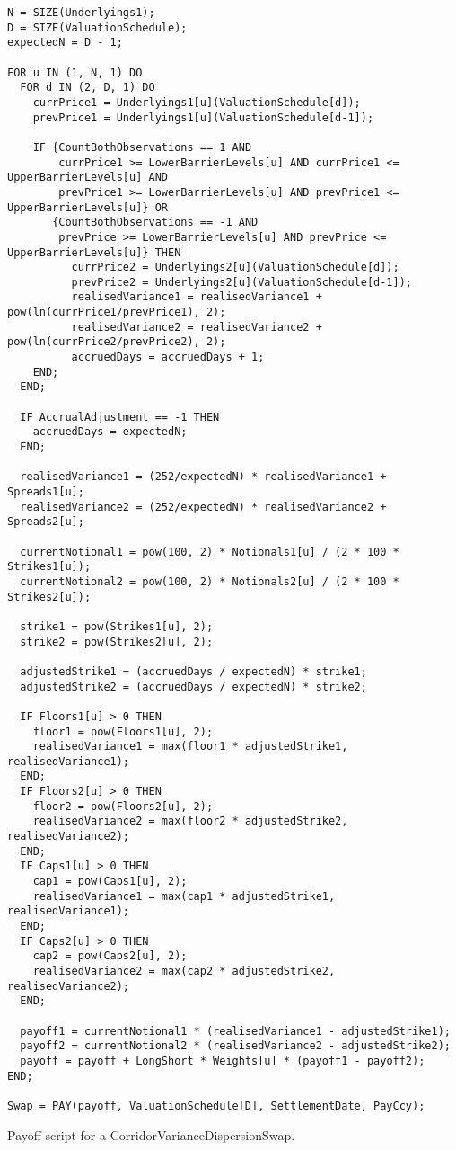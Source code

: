 \begin{listing}[hbt]
\begin{verbatim}
N = SIZE(Underlyings1);
D = SIZE(ValuationSchedule);
expectedN = D - 1;

FOR u IN (1, N, 1) DO
  FOR d IN (2, D, 1) DO
    currPrice1 = Underlyings1[u](ValuationSchedule[d]);
    prevPrice1 = Underlyings1[u](ValuationSchedule[d-1]);

    IF {CountBothObservations == 1 AND
        currPrice1 >= LowerBarrierLevels[u] AND currPrice1 <= UpperBarrierLevels[u] AND
        prevPrice1 >= LowerBarrierLevels[u] AND prevPrice1 <= UpperBarrierLevels[u]} OR
       {CountBothObservations == -1 AND
        prevPrice >= LowerBarrierLevels[u] AND prevPrice <= UpperBarrierLevels[u]} THEN
          currPrice2 = Underlyings2[u](ValuationSchedule[d]);
          prevPrice2 = Underlyings2[u](ValuationSchedule[d-1]);
          realisedVariance1 = realisedVariance1 + pow(ln(currPrice1/prevPrice1), 2);
          realisedVariance2 = realisedVariance2 + pow(ln(currPrice2/prevPrice2), 2);
          accruedDays = accruedDays + 1;
    END;
  END;

  IF AccrualAdjustment == -1 THEN
    accruedDays = expectedN;
  END;

  realisedVariance1 = (252/expectedN) * realisedVariance1 + Spreads1[u];
  realisedVariance2 = (252/expectedN) * realisedVariance2 + Spreads2[u];

  currentNotional1 = pow(100, 2) * Notionals1[u] / (2 * 100 * Strikes1[u]);
  currentNotional2 = pow(100, 2) * Notionals2[u] / (2 * 100 * Strikes2[u]);

  strike1 = pow(Strikes1[u], 2);
  strike2 = pow(Strikes2[u], 2);

  adjustedStrike1 = (accruedDays / expectedN) * strike1;
  adjustedStrike2 = (accruedDays / expectedN) * strike2;

  IF Floors1[u] > 0 THEN
    floor1 = pow(Floors1[u], 2);
    realisedVariance1 = max(floor1 * adjustedStrike1, realisedVariance1);
  END;
  IF Floors2[u] > 0 THEN
    floor2 = pow(Floors2[u], 2);
    realisedVariance2 = max(floor2 * adjustedStrike2, realisedVariance2);
  END;
  IF Caps1[u] > 0 THEN
    cap1 = pow(Caps1[u], 2);
    realisedVariance1 = max(cap1 * adjustedStrike1, realisedVariance1);
  END;
  IF Caps2[u] > 0 THEN
    cap2 = pow(Caps2[u], 2);
    realisedVariance2 = max(cap2 * adjustedStrike2, realisedVariance2);
  END;

  payoff1 = currentNotional1 * (realisedVariance1 - adjustedStrike1);
  payoff2 = currentNotional2 * (realisedVariance2 - adjustedStrike2);
  payoff = payoff + LongShort * Weights[u] * (payoff1 - payoff2);
END;

Swap = PAY(payoff, ValuationSchedule[D], SettlementDate, PayCcy);
\end{verbatim}
\caption{Payoff script for a CorridorVarianceDispersionSwap.}
\label{lst:corridor_variance_dispersion_swap}
\end{listing}

